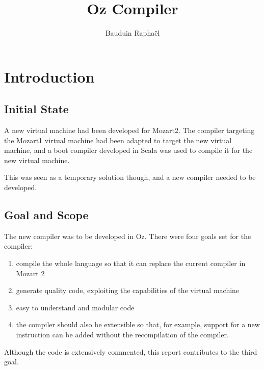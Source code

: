 \documentclass[a4paper]{memoir}
\author{Bauduin Raphaël}
\title{Oz Compiler}
\begin{document}
\newcommand{\nav}[1]{#1}

\lstset{language=Oz,basicstyle=\ttfamily\small,columns=fullflexible}

\ifdraftdoc
{}
\fi

\immediate{} 

\maketitle
\tableofcontents


\chapter{Introduction}
\section{Initial State}
A new virtual machine had been developed for Mozart2. The compiler
targeting the Mozart1 virtual machine had been adapted to target the new
virtual machine, and a boot compiler developed in Scala was used to compile it
for the new virtual machine.

This was seen as a temporary solution though, and a new compiler needed
to be developed. 


\section{Goal and Scope}
The new compiler was to be developed in Oz.
There were four goals set for the compiler:
\begin{enumerate}
  \item compile the whole language so that it can replace the current compiler in Mozart 2
  \item generate quality code, exploiting the capabilities of the virtual machine
  \item easy to understand and modular code
  \item the compiler should also be extensible so that, for example, support for a new instruction can be added without the recompilation of the compiler.
\end{enumerate}
Although the code is extensively commented, this report contributes to the third goal.
\end{document}
